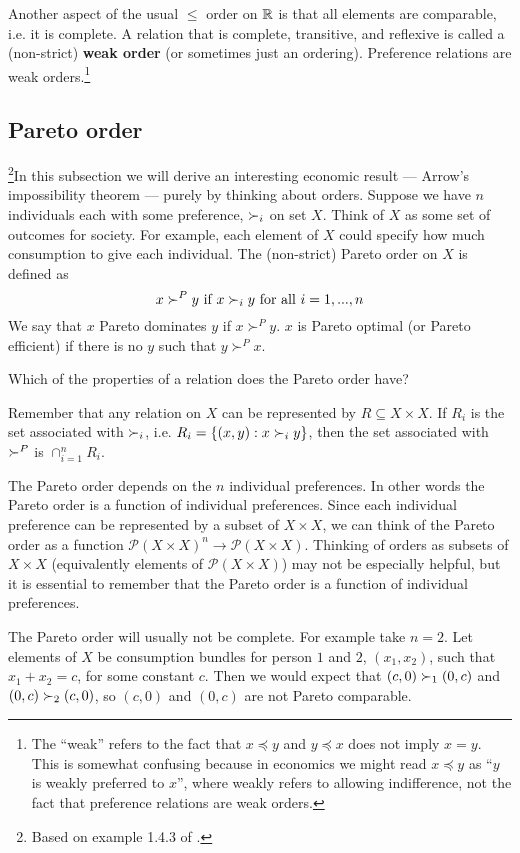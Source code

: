 Another aspect of the usual $\leq$ order on $\mathbb{R}$ is that all elements
are comparable, i.e. it is complete. A relation that is complete,
transitive, and reflexive is called a (non-strict) \textbf{weak order}
(or sometimes just an ordering). Preference relations are weak
orders.\footnote{The ``weak'' refers to the fact that $x \preceq y$
  and $y \preceq x$ does not imply $x=y$. This is somewhat confusing
  because in economics we might read $x \preceq y$ as ``$y$ is weakly
  preferred to $x$'', where weakly refers to allowing indifference,
  not the fact that preference relations are weak orders.}

\subsection{Pareto order}

\footnote{Based on example 1.4.3 of \cite{carter2001}.}In this
subsection we will derive an interesting economic result --- Arrow's
impossibility theorem --- purely by thinking about orders.  Suppose we
have $n$ individuals each with some preference, $\succ_i$ on set
$X$. Think of $X$ as some set of outcomes for society. For example,
each element of $X$ could specify how much consumption to give each
individual. The (non-strict) Pareto order on $X$ is defined as
\[ x \succ^P y \text{ if } x \succ_i y \text{ for all } i=1,...,n \]
We say that $x$ Pareto dominates $y$ if $x \succ^P y$. $x$ is Pareto
optimal (or Pareto efficient) if there is no $y$ such that $y \succ^P
x$. 
\begin{exercise}
  Which of the properties of a relation does the Pareto order have?
\end{exercise}
Remember that any relation on $X$ can be represented by $R \subseteq X
\times X$. If $R_i$ is the set associated with $\succ_i$, i.e. $R_i =
\{(x,y): x \succ_i y \}$, then the set associated with $\succ^P$ is
$\cap_{i=1}^n R_i$. 

The Pareto order depends on the $n$ individual preferences. In other
words the Pareto order is a function of individual preferences. Since
each individual preference can be represented by a subset of $X \times
X$, we can think of the Pareto order as a function $\mathcal{P}(X
\times X)^n \to \mathcal{P}(X \times X)$. Thinking of orders as
subsets of $X \times X$ (equivalently elements of $\mathcal{P}(X\times
X)$) may not be especially helpful, but it is essential to remember
that the Pareto order is a function of individual preferences.

The Pareto order will usually not be complete. For example take
$n=2$.  Let elements of $X$ be consumption bundles for person $1$ and
$2$, $(x_1,x_2)$, such that $x_1 + x_2 = c$, for some constant
$c$. Then we would expect that $(c,0) \succ_1 (0,c)$ and $(0,c)
\succ_2 (c,0)$, so $(c,0)$ and $(0,c)$ are not Pareto comparable. 

